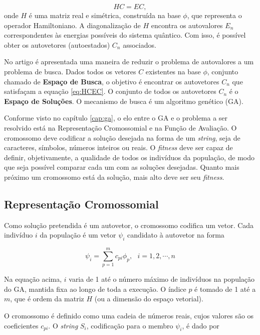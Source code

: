 	\begin{equation}\label{eq:HCEC}
		HC = EC,
	\end{equation}
	onde $H$ é uma matriz real e simétrica, construída na base ${\phi}$, que representa o operador Hamiltoniano. A diagonalização de $H$ encontra os autovalores $E_n$ correspondentes às energias possíveis do sistema quântico. Com isso, é possível obter os autovetores (autoestados) $C_n$ associados.
	
	No artigo \cite{metodo2004} é apresentada uma maneira de reduzir o problema de autovalores a um problema de busca. Dados todos os vetores $C$ existentes na base $\phi$, conjunto chamado de \textbf{Espaço de Busca}, o objetivo é encontrar os autovetores $C_n$ que satisfaçam a equação \ref{eq:HCEC}. O conjunto de todos os autovetores $C_n$ é o \textbf{Espaço de Soluções}. O mecanismo de busca é um algoritmo genético (GA).
	
	Conforme visto no capítulo \ref{cap:ga}, o elo entre o GA e o problema a ser resolvido está na Representação Cromossomial e na Função de Avaliação. O cromossomo deve codificar a solução desejada na forma de um \emph{string}, seja de caracteres, símbolos, números inteiros ou reais. O \emph{fitness} deve ser capaz de definir, objetivamente, a qualidade de todos os indivíduos da população, de modo que seja possível comparar cada um com as soluções desejadas. Quanto mais próximo um cromossomo está da solução, mais alto deve ser seu \emph{fitness}.

	\subsection{Representação Cromossomial}
	
	Como solução pretendida é um autovetor, o cromossomo codifica um vetor. Cada indivíduo $i$ da população é um vetor $\psi_i$ candidato à autovetor na forma
	
	\begin{equation}
		\psi_i = \sum_{p=1}^m c_{pi}\phi_p, \mbox{   } i = 1,2, \cdots, n
	\end{equation}
	
	Na equação acima, $i$ varia de 1 até o número máximo de indivíduos na população do GA, mantida fixa ao longo de toda a execução. O índice $p$ é tomado de 1 até a $m$, que é ordem da matriz $H$ (ou a dimensão do espaço vetorial).
	
	O cromossomo é definido como uma cadeia de números reais, cujos valores são os coeficientes $c_{pi}$. O \emph{string} $S_i$, codificação para o membro $\psi_i$, é dado por
	

